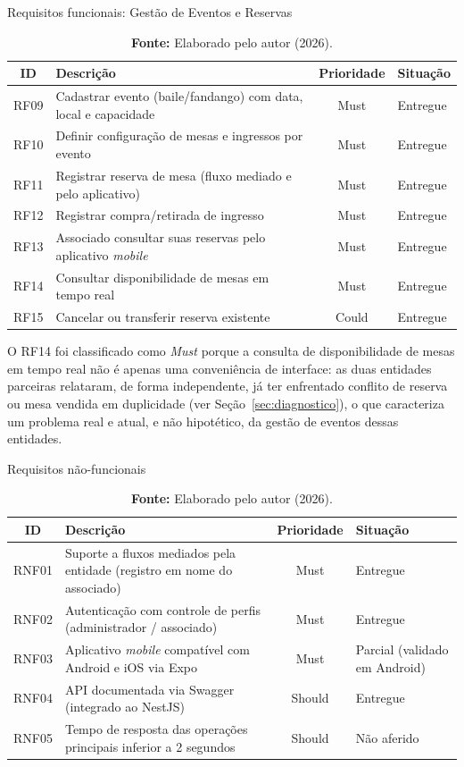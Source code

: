 \documentclass[12pt,a4paper]{article}
\begin{document}
\begin{table}[H]
  \centering
  \caption{Requisitos funcionais: Gestão de Eventos e Reservas}
  \label{tab:rf-eventos}
  \begin{tabular}{@{}cL{7.4cm}cL{3.2cm}@{}}
    \toprule
    \textbf{ID} & \textbf{Descrição} & \textbf{Prioridade} & \textbf{Situação} \\
    \midrule
    RF09 & Cadastrar evento (baile/fandango) com data, local e capacidade   & Must   & Entregue \\
    RF10 & Definir configuração de mesas e ingressos por evento             & Must   & Entregue \\
    RF11 & Registrar reserva de mesa (fluxo mediado e pelo aplicativo)      & Must   & Entregue \\
    RF12 & Registrar compra/retirada de ingresso                            & Must   & Entregue \\
    RF13 & Associado consultar suas reservas pelo aplicativo \textit{mobile}& Must   & Entregue \\
    RF14 & Consultar disponibilidade de mesas em tempo real                 & Must   & Entregue \\
    RF15 & Cancelar ou transferir reserva existente                         & Could  & Entregue \\
    \bottomrule
  \end{tabular}
  \caption*{\textbf{Fonte:} Elaborado pelo autor (2026).}
\end{table}

O RF14 foi classificado como \textit{Must} porque a consulta de disponibilidade de mesas em tempo
real não é apenas uma conveniência de interface: as duas entidades parceiras relataram, de forma
independente, já ter enfrentado conflito de reserva ou mesa vendida em duplicidade (ver
Seção~\ref{sec:diagnostico}), o que caracteriza um problema real e atual, e não hipotético, da
gestão de eventos dessas entidades.

\begin{table}[H]
  \centering
  \caption{Requisitos não-funcionais}
  \label{tab:rnf}
  \begin{tabular}{@{}cL{7.4cm}cL{3.2cm}@{}}
    \toprule
    \textbf{ID} & \textbf{Descrição} & \textbf{Prioridade} & \textbf{Situação} \\
    \midrule
    RNF01 & Suporte a fluxos mediados pela entidade (registro em nome do associado) & Must   & Entregue \\
    RNF02 & Autenticação com controle de perfis (administrador / associado)         & Must   & Entregue \\
    RNF03 & Aplicativo \textit{mobile} compatível com Android e iOS via Expo        & Must   & Parcial (validado em Android) \\
    RNF04 & API documentada via Swagger (integrado ao NestJS)                       & Should & Entregue \\
    RNF05 & Tempo de resposta das operações principais inferior a 2 segundos        & Should & Não aferido \\
    \bottomrule
  \end{tabular}
  \caption*{\textbf{Fonte:} Elaborado pelo autor (2026).}
\end{table}
\end{document}
